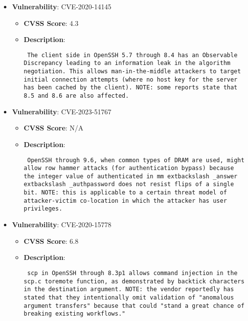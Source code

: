 \documentclass{article}
\begin{document}
\begin{itemize}
        \item \textbf{Vulnerability}: CVE-2020-14145
        \begin{itemize}
            \item \textbf{CVSS Score}:  4.3 
            \item \textbf{Description}: \parbox{\linewidth}{\texttt{ The client side in OpenSSH 5.7 through 8.4 has an Observable Discrepancy leading to an information leak in the algorithm negotiation. This allows man-in-the-middle attackers to target initial connection attempts (where no host key for the server has been cached by the client). NOTE: some reports state that 8.5 and 8.6 are also affected. }}
        \end{itemize}
    
        \item \textbf{Vulnerability}: CVE-2023-51767
        \begin{itemize}
            \item \textbf{CVSS Score}:  N/A 
            \item \textbf{Description}: \parbox{\linewidth}{\texttt{ OpenSSH through 9.6, when common types of DRAM are used, might allow row hammer attacks (for authentication bypass) because the integer value of authenticated in mm	extbackslash _answer	extbackslash _authpassword does not resist flips of a single bit. NOTE: this is applicable to a certain threat model of attacker-victim co-location in which the attacker has user privileges. }}
        \end{itemize}
    
        \item \textbf{Vulnerability}: CVE-2020-15778
        \begin{itemize}
            \item \textbf{CVSS Score}:  6.8 
            \item \textbf{Description}: \parbox{\linewidth}{\texttt{ scp in OpenSSH through 8.3p1 allows command injection in the scp.c toremote function, as demonstrated by backtick characters in the destination argument. NOTE: the vendor reportedly has stated that they intentionally omit validation of "anomalous argument transfers" because that could "stand a great chance of breaking existing workflows." }}
        \end{itemize}
    

\end{itemize}
\end{document}
